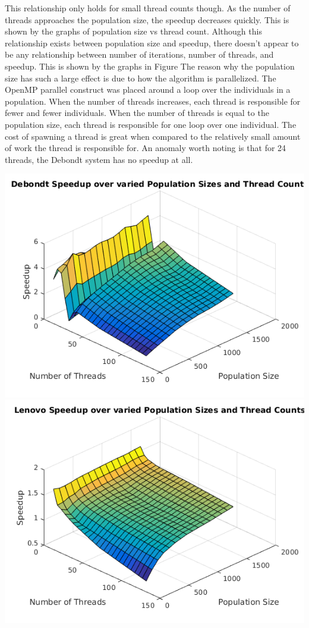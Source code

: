 \documentclass[10pt,letterpaper]{article}
\begin{document}
This relationship only holds for small thread counts though. As the number of threads approaches the population size, the speedup decreases quickly. This is shown by the graphs of population size vs thread count. %
Although this relationship exists between population size and speedup, there doesn't appear to be any relationship between number of iterations, number of threads, and speedup. This is shown by the graphs in Figure %
The reason why the population size has such a large effect is due to how the algorithm is parallelized. The OpenMP parallel construct was placed around a loop over the individuals in a population. When the number of threads increases, each thread is responsible for fewer and fewer individuals. When the number of threads is equal to the population size, each thread is responsible for one loop over one individual. The cost of spawning a thread is great when compared to the relatively small amount of work the thread is responsible for. An anomaly worth noting is that for 24 threads, the Debondt system has no speedup at all. %


\includegraphics[scale=1]{../img/Debondt_PopulationvsThreads.png} 
\includegraphics[scale=1]{../img/Lenovo_PopulationvsThreads.png} 
\end{document}
